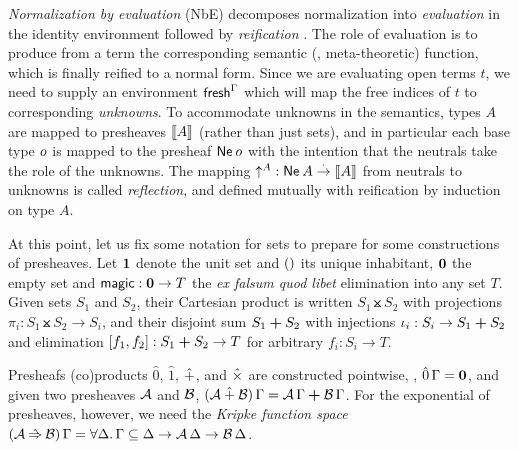 \documentclass[a4paper,USenglish,cleveref, autoref]{lipics-v2019}
\begin{document}
%
\emph{Normalization by evaluation} (NbE)
decomposes normalization into
\emph{evaluation}
in the identity environment \nofbox{$\idenv\Gamma : \den \Gamma \Gamma$}
followed by
\emph{reification}
.
The role of evaluation is to produce from a term the corresponding
semantic (\ie, meta-theoretic) function, which is finally reified to a normal form.
Since we are evaluating open terms $t$, we need to supply an environment
$\mathsf{fresh}^{\Gamma}$ which will map the free indices of $t$ to corresponding
\emph{unknowns}.  To accommodate unknowns in the semantics, types $A$
are mapped to presheaves $\mathopen{{[\kern-0.14em[}} A \mathclose{{]\kern-0.14em]}}$ (rather than just sets), and in
particular each base type $o$ is mapped to the presheaf
$\mathsf{Ne}^{}\,o$ with the intention that the neutrals take the role of
the unknowns.  The mapping $\mathord{\uparrow_{}^{A}} : \mathsf{Ne}^{}\,A \stackrel{\cdot}{\to} \mathopen{{[\kern-0.14em[}} A \mathclose{{]\kern-0.14em]}}$ from
neutrals to unknowns is called \emph{reflection}, and defined mutually
with reification by induction on type $A$.

At this point, let us fix some notation for sets to prepare for some
constructions of presheaves.  Let $\mbox{\textbf{1}}$ denote the unit set and
$()$ its unique inhabitant, $\mbox{\textbf{0}}$ the empty set and
$\mathsf{magic} : \mbox{\textbf{0}} \to T$ the \emph{ex falsum quod libet} elimination
into any set $T$.  Given sets $S_1$ and $S_2$, their Cartesian product
is written $S_1 \btimes S_2$ with projections $\pi_i : S_1 \btimes S_2
\to S_i$, and their disjoint sum $S_1 \boldsymbol{+} S_2$ with injections
$\iota_i : S_i \to S_1 \boldsymbol{+} S_2$ and elimination $[f_1,f_2] : S_1 \boldsymbol{+}
S_2 \to T$ for arbitrary $f_i : S_i \to T$.

Presheafs (co)products $\hat0$, $\hat1$, $\mathbin{\hat+}$, and $\mathbin{\hat\times}$ are
constructed pointwise, \eg, $\hat0\,\Gamma = \mbox{\textbf{0}}$, and given two
presheaves $\mathcal{A}$ and $\mathcal{B}$,
$(\mathcal{A} \mathbin{\hat+} \mathcal{B})\,\Gamma = \mathcal{A}\,\Gamma \boldsymbol{+} \mathcal{B}\,\Gamma$.  For the
exponential of presheaves, however, we need the \emph{Kripke function
  space}
$(\mathcal{A} \mathbin{\hat{\Rightarrow}} \mathcal{B})\,\Gamma = \forall \Delta.\, \Gamma \subseteq \Delta
\to \mathcal{A}\,\Delta \to \mathcal{B}\,\Delta$.
\end{document}
